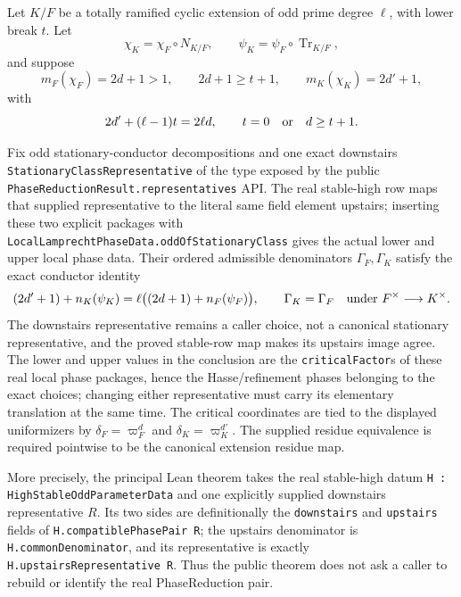 \begin{theorem}\label{mod:parameters-ramifiedhassecomparison}
Let $K/F$ be a totally ramified cyclic extension of odd prime degree
$\ell$, with lower break $t$.  Let
\[
 \chi_K=\chi_F\circ N_{K/F},\qquad
 \psi_K=\psi_F\circ\operatorname{Tr}_{K/F},
\]
and suppose
\[
 m_F(\chi_F)=2d+1>1,\qquad 2d+1\geq t+1,
 \qquad m_K(\chi_K)=2d'+1,
\]
with
\[
 2d'+(\ell-1)t=2\ell d,
 \qquad t=0\quad\hbox{or}\quad d\geq t+1.
\]

Fix odd stationary-conductor decompositions and one exact downstairs
\texttt{StationaryClassRepresentative} of the type exposed by the public
\texttt{PhaseReductionResult.representatives} API.  The real stable-high row
maps that supplied representative to the literal same field element upstairs;
inserting these two explicit packages with
\texttt{LocalLamprechtPhaseData.oddOfStationaryClass} gives the actual lower
and upper local phase data.  Their ordered admissible denominators
$\Gamma_F,\Gamma_K$ satisfy the exact conductor identity
\[
 (2d'+1)+n_K(\psi_K)
   =\ell\bigl((2d+1)+n_F(\psi_F)\bigr),
 \qquad \Gamma_K=\Gamma_F\quad\hbox{under }F^\times\longrightarrow K^\times.
\]
The downstairs representative remains a caller choice, not a canonical
stationary representative, and the proved stable-row map makes its upstairs
image agree.  The lower and upper values in
the conclusion are the \texttt{criticalFactor}s of these real local phase
packages, hence the Hasse/refinement phases belonging to the exact choices;
changing either representative must carry its elementary translation at the
same time.  The critical coordinates are tied to the displayed uniformizers
by $\delta_F=\varpi_F^d$ and $\delta_K=\varpi_K^{d'}$.  The supplied residue
equivalence is required pointwise to be the canonical extension residue map.

More precisely, the principal Lean theorem takes the real stable-high datum
\texttt{H : HighStableOddParameterData} and one explicitly supplied
downstairs representative $R$.  Its two sides are definitionally the
\texttt{downstairs} and \texttt{upstairs} fields of
\texttt{H.compatiblePhasePair R}; the upstairs denominator is
\texttt{H.commonDenominator}, and its representative is exactly
\texttt{H.upstairsRepresentative R}.  Thus the public theorem does not ask a
caller to rebuild or identify the real PhaseReduction pair.


\end{theorem}
